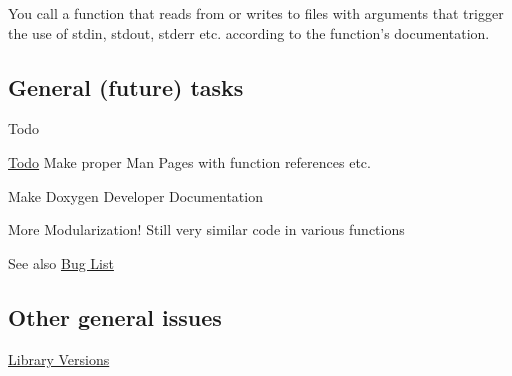 \begin{DoxyItemize}
\item You call a function that reads from or writes to files with arguments that trigger the use of {\ttfamily stdin}, {\ttfamily stdout}, {\ttfamily stderr} etc. according to the function's documentation.
\end{DoxyItemize}\hypertarget{properties_general_tasks}{}\subsection{General (future) tasks}\label{properties_general_tasks}
\begin{DoxyRefDesc}{Todo}
\item[\hyperlink{todo__todo000002}{Todo}]Make proper Man Pages with function references etc. 

Make Doxygen Developer Documentation 

More Modularization! Still very similar code in various functions \end{DoxyRefDesc}
\begin{DoxySeeAlso}{See also}
\hyperlink{bug}{Bug List}
\end{DoxySeeAlso}
\hypertarget{properties_misc_general_issues}{}\subsection{Other general issues}\label{properties_misc_general_issues}

\begin{DoxyItemize}
\item \hyperlink{development_versions}{Library Versions} 
\end{DoxyItemize}